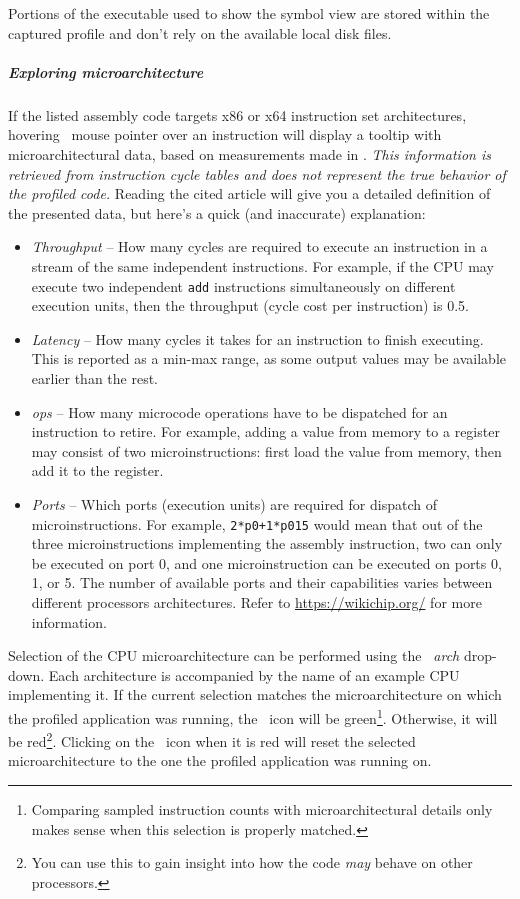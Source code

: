 \documentclass[hidelinks,titlepage,a4paper,twoside]{article}
\begin{document}
Portions of the executable used to show the symbol view are stored within the captured profile and don't rely on the available local disk files.

\subparagraph{Exploring microarchitecture}

If the listed assembly code targets x86 or x64 instruction set architectures, hovering \faArrowPointer{}~mouse pointer over an instruction will display a tooltip with microarchitectural data, based on measurements made in \cite{Abel19a}. \emph{This information is retrieved from instruction cycle tables and does not represent the true behavior of the profiled code.} Reading the cited article will give you a detailed definition of the presented data, but here's a quick (and inaccurate) explanation:

\begin{itemize}
\item \emph{Throughput} -- How many cycles are required to execute an instruction in a stream of the same independent instructions. For example, if the CPU may execute two independent \texttt{add} instructions simultaneously on different execution units, then the throughput (cycle cost per instruction) is 0.5.
\item \emph{Latency} -- How many cycles it takes for an instruction to finish executing. This is reported as a min-max range, as some output values may be available earlier than the rest.
\item \emph{\textmu{}ops} -- How many microcode operations have to be dispatched for an instruction to retire. For example, adding a value from memory to a register may consist of two microinstructions: first load the value from memory, then add it to the register.
\item \emph{Ports} -- Which ports (execution units) are required for dispatch of microinstructions. For example, \texttt{2*p0+1*p015} would mean that out of the three microinstructions implementing the assembly instruction, two can only be executed on port 0, and one microinstruction can be executed on ports 0, 1, or 5. The number of available ports and their capabilities varies between different processors architectures. Refer to \url{https://wikichip.org/} for more information.
\end{itemize}

Selection of the CPU microarchitecture can be performed using the \emph{\faMicrochip{}~\textmu{}arch} drop-down. Each architecture is accompanied by the name of an example CPU implementing it. If the current selection matches the microarchitecture on which the profiled application was running, the \faMicrochip{}~icon will be green\footnote{Comparing sampled instruction counts with microarchitectural details only makes sense when this selection is properly matched.}. Otherwise, it will be red\footnote{You can use this to gain insight into how the code \emph{may} behave on other processors.}. Clicking on the \faMicrochip{}~icon when it is red will reset the selected microarchitecture to the one the profiled application was running on.
\end{document}
